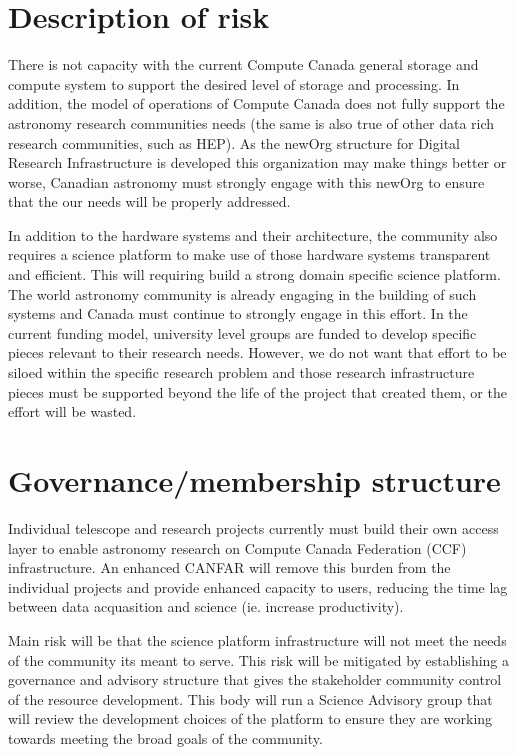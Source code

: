 \documentclass[11pt]{article}
\begin{document}
\section{Description of risk}
There is not capacity with the current Compute Canada general storage and compute system to support the desired level of storage and processing.  In addition, the model of operations of Compute Canada does not fully support the astronomy research communities needs (the same is also true of other data rich research communities, such as HEP).   As the newOrg structure for Digital Research Infrastructure is developed this organization may make things better or worse, Canadian astronomy must strongly engage with this newOrg to ensure that the our needs will be properly addressed.  

In addition to the hardware systems and their architecture, the community also requires a science platform to make use of those hardware systems transparent and efficient.   This will requiring build a strong domain specific science platform.  The world astronomy community is already engaging in the building of such systems and Canada must continue to strongly engage in this effort.  In the current funding model,  university level groups are funded to develop specific pieces relevant to their research needs.  However, we do not want that effort to be siloed within the specific research problem and those research infrastructure pieces must be supported beyond the life of the project that created them, or the effort will be wasted.

 
\section{Governance/membership structure}




\begin{lrptextbox}
Individual telescope and research projects currently must build their own access layer to enable astronomy research on Compute Canada Federation (CCF) infrastructure.  An enhanced CANFAR will remove this burden from the individual projects and provide enhanced capacity to users, reducing the time lag between data acquasition and science (ie. increase productivity).
\end{lrptextbox}

\begin{lrptextbox}
Main risk will be that the science platform infrastructure will not meet the needs of the community its meant to serve.  This risk will be mitigated by establishing a governance and advisory structure that gives the stakeholder community control of the resource development.  This body will run a Science Advisory group that will review the development choices of the platform to ensure they are working towards meeting the broad goals of the community.  
\end{lrptextbox}
\end{document}
